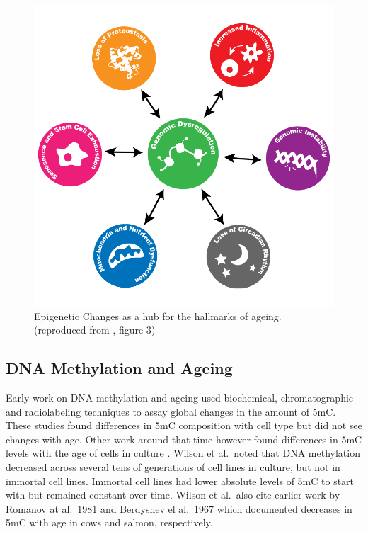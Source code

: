 \documentclass[
]{book}
\begin{document}
\begin{figure}

{\centering \includegraphics[width=0.6\linewidth]{figs/Booth2016_F3_epigenomeHubAgingHallmarks_alpha} 

}

\caption{Epigenetic Changes as a hub for the hallmarks of ageing.
(reproduced from \citep{Booth2016}, figure 3)}\label{fig:Booth2016fig3}
\end{figure}




\hypertarget{dna-methylation-and-ageing}{%
\subsection{DNA Methylation and Ageing}\label{dna-methylation-and-ageing}}

Early work on DNA methylation and ageing used biochemical, chromatographic and radiolabeling techniques to assay global changes in the amount of 5mC. These studies found differences in 5mC composition with cell type \citep{Ehrlich1982} but did not see changes with age. Other work around that time however found differences in 5mC levels with the age of cells in culture \citep{Wilson1983}. Wilson et al.~noted that DNA methylation decreased across several tens of generations of cell lines in culture, but not in immortal cell lines. Immortal cell lines had lower absolute levels of 5mC to start with but remained constant over time. Wilson et al.~also cite earlier work by Romanov at al.~1981 \citep{Romanov1981} and Berdyshev el al.~1967 \citep{Berdyshev1967} which documented decreases in 5mC with age in cows and salmon, respectively.
\end{document}
